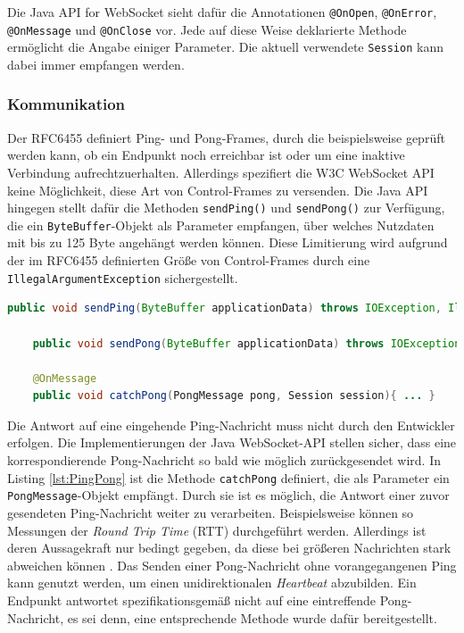 \documentclass[11pt,a4paper,titlepage]{scrartcl}
\numberwithin{equation}{section}
\begin{document}
\noindent Die Java\texttrademark{} API for WebSocket sieht dafür die Annotationen \texttt{@OnOpen}, \texttt{@OnError}, \texttt{@OnMessage} und \texttt{@OnClose} vor. Jede auf diese Weise deklarierte Methode ermöglicht die Angabe einiger Parameter. Die aktuell verwendete \texttt{Session} kann dabei immer empfangen werden. \\

\subsubsection{Kommunikation}\label{subsubsec:javaKommunikation}
Der RFC6455 definiert Ping- und Pong-Frames, durch die beispielsweise geprüft werden kann, ob ein Endpunkt noch erreichbar ist oder um eine inaktive Verbindung aufrechtzuerhalten. Allerdings spezifiert die W3C WebSocket API keine Möglichkeit, diese Art von Control-Frames zu versenden. Die Java API hingegen stellt dafür die Methoden \texttt{sendPing()} und \texttt{sendPong()} zur Verfügung, die ein \texttt{ByteBuffer}-Objekt als Parameter empfangen, über welches Nutzdaten mit bis zu 125 Byte angehängt werden können. Diese Limitierung wird aufgrund der im RFC6455 definierten Größe von Control-Frames durch eine \texttt{IllegalArgumentException} sichergestellt.\\

\begin{lstlisting}[frame=single, language=Java, caption=Java: Ping/Pong Nachrichten, label=lst:PingPong]
	public void sendPing(ByteBuffer applicationData) throws IOException, IllegalArgumentException

	public void sendPong(ByteBuffer applicationData) throws IOException, IllegalArgumentException

	@OnMessage
	public void catchPong(PongMessage pong, Session session){ ... }
\end{lstlisting}

\noindent Die Antwort auf eine eingehende Ping-Nachricht muss nicht durch den Entwickler erfolgen. Die Implementierungen der Java WebSocket-API stellen sicher, dass eine korrespondierende Pong-Nachricht so bald wie möglich zurückgesendet wird. In Listing \ref{lst:PingPong} ist die Methode \texttt{catchPong} definiert, die als Parameter ein \texttt{PongMessage}-Objekt empfängt. Durch sie ist es möglich, die Antwort einer zuvor gesendeten Ping-Nachricht weiter zu verarbeiten. Beispielsweise können so Messungen der \textit{Round Trip Time} (RTT) durchgeführt werden. Allerdings ist deren Aussagekraft nur bedingt gegeben, da diese bei größeren Nachrichten stark abweichen können \autocite[116]{coward_java_2014}. Das Senden einer Pong-Nachricht ohne vorangegangenen Ping kann genutzt werden, um einen unidirektionalen \textit{Heartbeat} abzubilden. Ein Endpunkt antwortet spezifikationsgemäß nicht auf eine eintreffende Pong-Nachricht, es sei denn, eine entsprechende Methode wurde dafür bereitgestellt. \\
\end{document}
